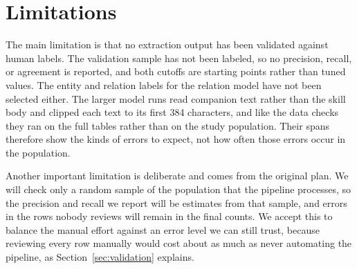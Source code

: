 \section{Limitations}
\label{sec:limitations}

The main limitation is that no extraction output has been validated against human labels.
The validation sample has not been labeled, so no precision, recall, or agreement is reported, and both cutoffs are starting points rather than tuned values.
The entity and relation labels for the relation model have not been selected either.
The larger model runs read companion text rather than the skill body and clipped each text to its first 384 characters, and like the data checks they ran on the full tables rather than on the study population.
Their spans therefore show the kinds of errors to expect, not how often those errors occur in the population.

Another important limitation is deliberate and comes from the original plan.
We will check only a random sample of the population that the pipeline processes, so the precision and recall we report will be estimates from that sample, and errors in the rows nobody reviews will remain in the final counts.
We accept this to balance the manual effort against an error level we can still trust, because reviewing every row manually would cost about as much as never automating the pipeline, as Section~\ref{sec:validation} explains.
